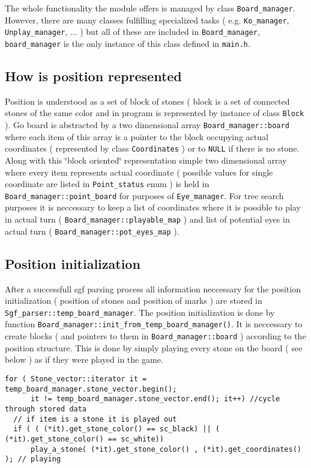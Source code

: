 The whole functionality the module offers is managed by class {\tt Board\_\-manager}. However, there are many classes fulfilling specialized tasks ( e.g. {\tt Ko\_\-manager}, {\tt Unplay\_\-manager}, ... ) but all of these are included in {\tt Board\_\-manager}, {\tt board\_\-manager} is the only instance of this class defined in {\tt main.h}.\subsection{How is position represented}\label{page_6_page_6__sec_1}
Position is understood as a set of block of stones ( block is a set of connected stones of the same color and in program is represented by instance of class {\tt Block} ). Go board is abstracted by a two dimensional array {\tt Board\_\-manager::board} where each item of this array is a pointer to the block occupying actual coordinates ( represented by class {\tt Coordinates} ) or to {\tt NULL} if there is no stone. Along with this \char`\"{}block oriented\char`\"{} representation simple two dimensional array where every item represents actual coordinate ( possible values for single coordinate are listed in {\tt Point\_\-status} enum ) is held in {\tt Board\_\-manager::point\_\-board} for purposes of {\tt Eye\_\-manager}. For tree search purposes it is neccessary to keep a list of coordinates where it is possible to play in actual turn ( {\tt Board\_\-manager::playable\_\-map} ) and list of potential eyes in actual turn ( {\tt Board\_\-manager::pot\_\-eyes\_\-map} ).\subsection{Position initialization}\label{page_6_page_6__sec_2}
After a successfull sgf parsing process all information neccessary for the position initialization ( position of stones and position of marks ) are stored in {\tt Sgf\_\-parser::temp\_\-board\_\-manager}. The position initialization is done by function {\tt Board\_\-manager::init\_\-from\_\-temp\_\-board\_\-manager()}. It is neccessary to create blocks ( and pointers to them in {\tt Board\_\-manager::board} ) according to the position structure. This is done by simply playing every stone on the board ( see below ) as if they were played in the game. 

\footnotesize\begin{verbatim}for ( Stone_vector::iterator it = temp_board_manager.stone_vector.begin(); 
      it != temp_board_manager.stone_vector.end(); it++) //cycle through stored data
  // if item is a stone it is played out 
  if ( ( (*it).get_stone_color() == sc_black) || ( (*it).get_stone_color() == sc_white))  
      play_a_stone( (*it).get_stone_color() , (*it).get_coordinates() ); // playing
\end{verbatim}
\normalsize


